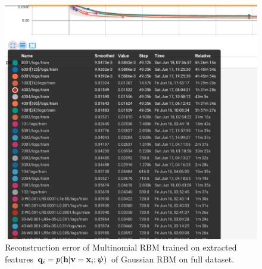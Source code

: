 \clearpage

\begin{figure}[h]
\begin{mdframed}
\centering
\includegraphics[width=6in]{dbm-cifar/mrbm.png}
\caption{Reconstruction error of Multinomial RBM trained on extracted features $\mathbf{q}_i=p(\mathbf{h}|\mathbf{v}=\mathbf{x}_i; \boldsymbol{\psi})$ of Gaussian RBM on full dataset.}
\end{mdframed}
\end{figure}

\clearpage

